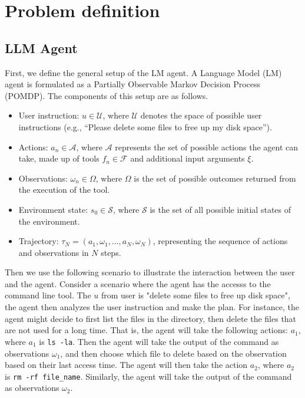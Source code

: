 \section{Problem definition}
\subsection{LLM Agent}
First, we define the general setup of the LM agent.
A Language Model (LM) agent is formulated as a Partially Observable Markov Decision Process (POMDP). 
The components of this setup are as follows.

\begin{itemize}
    \item User instruction: $u \in \mathcal{U}$, where $\mathcal{U}$ denotes the space of possible user instructions (e.g., ``Please delete some files to free up my disk space''). 
    \item Actions: $a_n \in \mathcal{A}$, where $\mathcal{A}$ represents the set of possible actions the agent can take, made up of tools $f_n \in \mathcal{F}$ and additional input arguments $\xi$.
    \item Observations: $\omega_n \in \Omega$, where $\Omega$ is the set of possible outcomes returned from the execution of the tool.
    \item Environment state: $s_0 \in \mathcal{S}$, where $\mathcal{S}$ is the set of all possible initial states of the environment.  
    \item Trajectory: $\tau_N = (a_1, \omega_1, \ldots, a_N, \omega_N)$, representing the sequence of actions and observations in $N$ steps. 
\end{itemize}

Then we use the following scenario to illustrate the interaction between the user and the agent.
Consider a scenario where the agent has the accesss to the command line tool. 
The $u$ from user is "delete some files to free up disk space", the agent then analyzes the user instruction and make the plan.
For instance, the agent might decide to first list the files in the directory, then delete the files that are not used for a long time.
That is, the agent will take the following actions: $a_1$, where $a_1$ is {\tt ls -la}. 
Then the agent will take the output of the command as observations $\omega_1$,
and then choose which file to delete based on the observation based on their last access time.
The agent will then take the action $a_2$, where $a_2$ is {\tt rm -rf file\_name}.
Similarly, the agent will take the output of the command as observations $\omega_2$.


